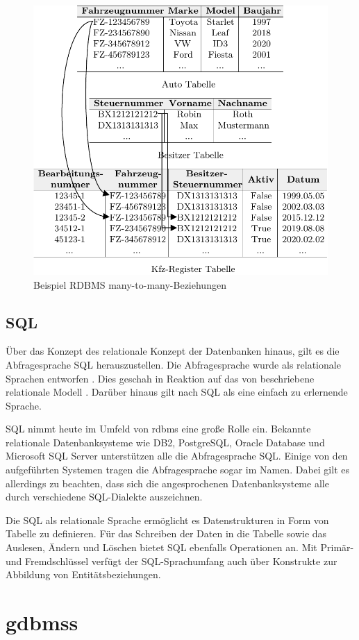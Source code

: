 \begin{figure}[h]
    \centering
    \includegraphics[width=\textwidth]{images/many-to-many.pdf}
    \caption{Beispiel RDBMS many-to-many-Beziehungen}
    \label{fig:rdbms_m2m}
\end{figure}

\subsection{SQL}
Über das Konzept des relationale Konzept der Datenbanken hinaus, gilt es die Abfragesprache SQL herauszustellen. Die Abfragesprache wurde als relationale Sprachen entworfen \cite{sql_history}. Dies geschah in Reaktion auf das von \citeauthor{codd_relational_model} beschriebene relationale Modell \cite{sql_history}. Darüber hinaus gilt nach \cite{sql_history} SQL als eine einfach zu erlernende Sprache. 

SQL nimmt heute im Umfeld von \acs{rdbms} eine große Rolle ein. Bekannte relationale Datenbanksysteme wie DB2, PostgreSQL, Oracle Database und Microsoft SQL Server unterstützen alle die Abfragesprache SQL. Einige von den aufgeführten Systemen tragen die Abfragesprache sogar im Namen. Dabei gilt es allerdings zu beachten, dass sich die angesprochenen Datenbanksysteme alle durch verschiedene SQL-Dialekte auszeichnen. 

Die SQL als relationale Sprache ermöglicht es Datenstrukturen in Form von Tabelle zu definieren. Für das Schreiben der Daten in die Tabelle sowie das Auslesen, Ändern und Löschen bietet SQL ebenfalls Operationen an. Mit Primär- und Fremdschlüssel verfügt der SQL-Sprachumfang auch über Konstrukte zur Abbildung von Entitätsbeziehungen. 

\section{\acl{gdbms}s}



